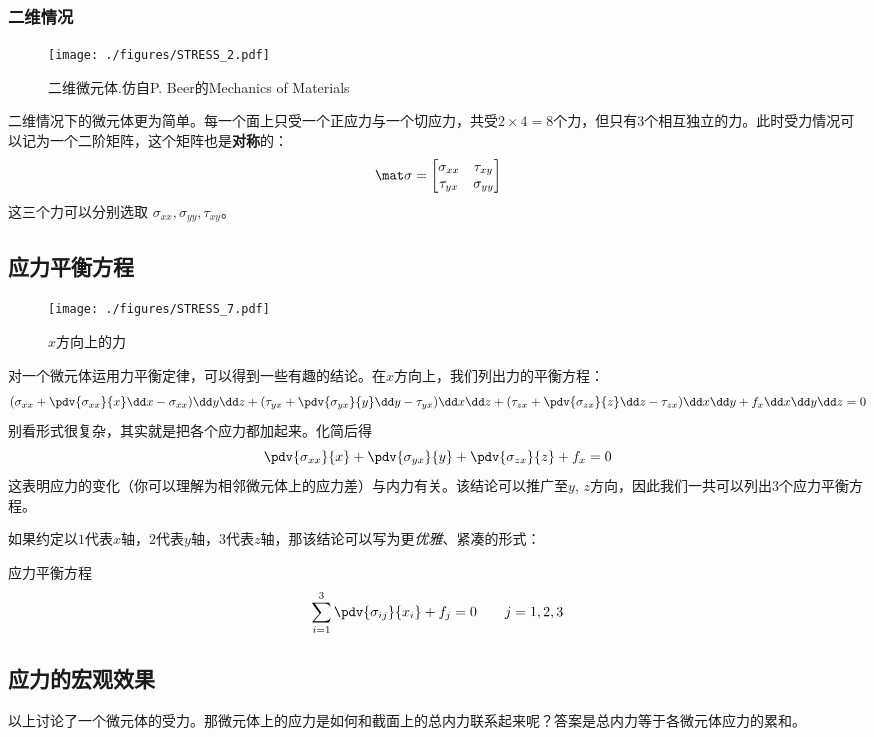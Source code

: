 \subsubsection{二维情况}
\begin{figure}[ht]
\centering
\texttt{[image: ./figures/STRESS\_2.pdf]}
\caption{二维微元体.仿自P. Beer的Mechanics of Materials} \label{STRESS_fig2}
\end{figure}

二维情况下的微元体更为简单。每一个面上只受一个正应力与一个切应力，共受$2\times4=8$个力，但只有$3$个相互独立的力。此时受力情况可以记为一个二阶矩阵，这个矩阵也是\textbf{对称}的：
\begin{equation}
\mat \sigma=
\begin{bmatrix}
\sigma_{xx} & \tau_{xy}\\
\tau_{yx} & \sigma_{yy}\\
\end{bmatrix}
\end{equation}
这三个力可以分别选取 $\sigma_{xx}, \sigma_{yy}, \tau_{xy}$。

\subsection{应力平衡方程}
\begin{figure}[ht]
\centering
\texttt{[image: ./figures/STRESS\_7.pdf]}
\caption{$x$方向上的力} \label{STRESS_fig7}
\end{figure}
对一个微元体运用力平衡定律，可以得到一些有趣的结论。在$x$方向上，我们列出力的平衡方程：
$$
(\sigma_{xx} + \pdv{\sigma_{xx}}{x} \dd x - \sigma_{xx})\dd y \dd z
+ (\tau_{yx} + \pdv{\sigma_{yx}}{y} \dd y - \tau_{yx}) \dd x \dd z
+ (\tau_{zx} + \pdv{\sigma_{zx}}{z} \dd z - \tau_{zx}) \dd x \dd y 
+ f_x \dd x \dd y \dd z= 0$$
别看形式很复杂，其实就是把各个应力都加起来。化简后得
$$
\pdv{\sigma_{xx}}{x} + \pdv{\sigma_{yx}}{y} + \pdv{\sigma_{zx}}{z} + f_x = 0
$$
这表明应力的变化（你可以理解为相邻微元体上的应力差）与内力有关。该结论可以推广至$y$, $z$方向，因此我们一共可以列出$3$个应力平衡方程。

如果约定以$1$代表$x$轴，$2$代表$y$轴，$3$代表$z$轴，那该结论可以写为更\textsl{优雅}、紧凑的形式：
\begin{theorem}{应力平衡方程}
$$
\sum_{i=1}^3 \pdv{\sigma_{ij}}{x_i} + f_j=0 \qquad j=1,2,3
$$
\end{theorem}

\subsection{应力的宏观效果}
以上讨论了一个微元体的受力。那微元体上的应力是如何和截面上的总内力联系起来呢？答案是总内力等于各微元体应力的累和。

